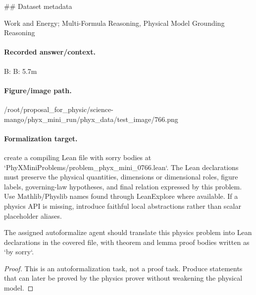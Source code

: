 \#\# Dataset metadata

Work and Energy; Multi-Formula Reasoning, Physical Model Grounding Reasoning

\paragraph{Recorded answer/context.}
B: B: 5.7m

\paragraph{Figure/image path.}
/root/proposal\_for\_physic/science-mango/phyx\_mini\_run/phyx\_data/test\_image/766.png

\paragraph{Formalization target.}
create a compiling Lean file with sorry bodies at `PhyXMiniProblems/problem\_phyx\_mini\_0766.lean`. The Lean declarations must preserve the physical quantities, dimensions or dimensional roles, figure labels, governing-law hypotheses, and final relation expressed by this problem.
Use Mathlib/Physlib names found through LeanExplore where available. If a physics API is missing, introduce faithful local abstractions rather than scalar placeholder aliases.

\begin{theorem}
\label{thm:physics:phyx_mini_0766:target}
The assigned autoformalize agent should translate this physics problem into Lean declarations in the covered file, with theorem and lemma proof bodies written as `by sorry`.
\end{theorem}
\begin{proof}
This is an autoformalization task, not a proof task. Produce statements that can later be proved by the physics prover without weakening the physical model.
\end{proof}

